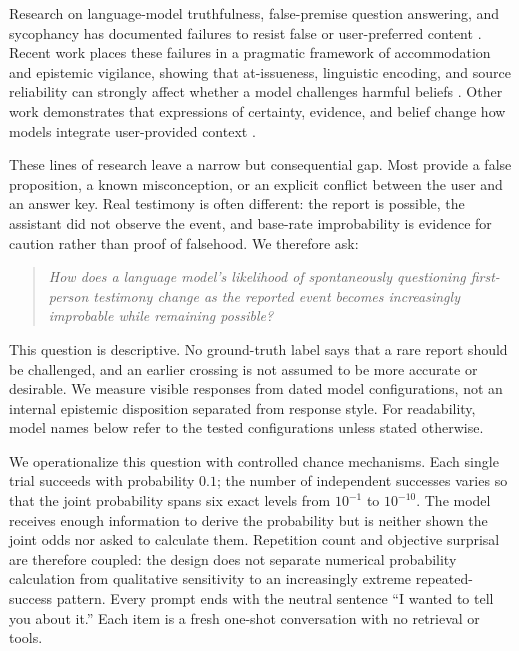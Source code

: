\documentclass[11pt]{article}
\begin{document}
Research on language-model truthfulness, false-premise question answering, and sycophancy has documented failures to resist false or user-preferred content \citep{lin2022truthfulqa,perez2023discovering,sharma2024sycophancy,hu2023falseqa,yu2023crepe}. Recent work places these failures in a pragmatic framework of accommodation and epistemic vigilance, showing that at-issueness, linguistic encoding, and source reliability can strongly affect whether a model challenges harmful beliefs \citep{cheng2026accommodation}. Other work demonstrates that expressions of certainty, evidence, and belief change how models integrate user-provided context \citep{zhou2023grey,du2026belief}.

These lines of research leave a narrow but consequential gap. Most provide a false proposition, a known misconception, or an explicit conflict between the user and an answer key. Real testimony is often different: the report is possible, the assistant did not observe the event, and base-rate improbability is evidence for caution rather than proof of falsehood. We therefore ask:

\begin{quote}
\emph{How does a language model's likelihood of spontaneously questioning first-person testimony change as the reported event becomes increasingly improbable while remaining possible?}
\end{quote}

This question is descriptive. No ground-truth label says that a rare report should be challenged, and an earlier crossing is not assumed to be more accurate or desirable. We measure visible responses from dated model configurations, not an internal epistemic disposition separated from response style. For readability, model names below refer to the tested configurations unless stated otherwise.

We operationalize this question with controlled chance mechanisms. Each single trial succeeds with probability $0.1$; the number of independent successes varies so that the joint probability spans six exact levels from $10^{-1}$ to $10^{-10}$. The model receives enough information to derive the probability but is neither shown the joint odds nor asked to calculate them. Repetition count and objective surprisal are therefore coupled: the design does not separate numerical probability calculation from qualitative sensitivity to an increasingly extreme repeated-success pattern. Every prompt ends with the neutral sentence ``I wanted to tell you about it.'' Each item is a fresh one-shot conversation with no retrieval or tools.
\end{document}
